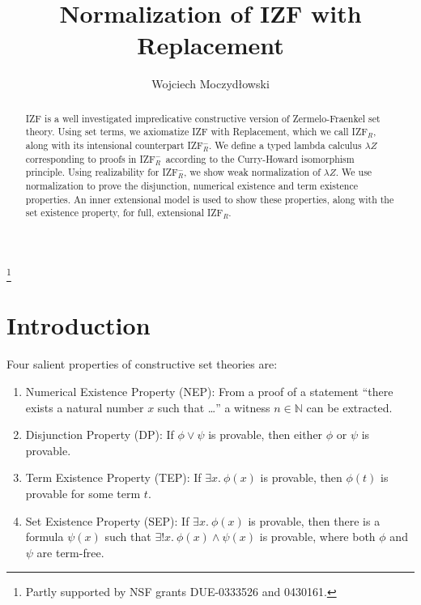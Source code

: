\documentclass{LMCS}
\newcommand{\nat}{\ensuremath{\mathbb{N}}}
\newcommand{\izfr}{IZF${}_R$}
\newcommand{\iizfr}{IZF${}_R^{-}$}
\newcommand{\li}{\lambda Z}
\begin{document}
\title{Normalization of IZF with Replacement}

\author{Wojciech Moczyd\l owski}
\address{Department of Computer Science, Cornell University, Ithaca, NY\ 14853, USA}
\thanks{Partly supported by NSF grants DUE-0333526 and 0430161.}

\titlecomment{}

\begin{abstract}
\noindent
IZF is a well investigated impredicative constructive version of
Zermelo-Fraen\-kel set theory. Using set terms, we axiomatize IZF with
Replacement, which we call \izfr, along with its intensional
counterpart \iizfr. We define a typed lambda calculus $\li$
corresponding to proofs in \iizfr\ according to the Curry-Howard
isomorphism principle. Using realizability for \iizfr, we show weak
normalization of $\li$. We use normalization to prove the disjunction,
numerical existence and term existence properties.  An inner
extensional model is used to show these properties, along with the set
existence property, for full, extensional \izfr.
\end{abstract}

\maketitle

\section{Introduction}

Four salient properties of constructive set theories are:
\begin{enumerate}[$\bullet$]
\item Numerical Existence Property (NEP): From a proof of a statement
``there exists a natural number $x$ such that {\ldots}'' a witness $n \in
\nat$ can be extracted. 
\item Disjunction Property (DP): If $\phi \lor \psi$ is provable, then
either $\phi$ or $\psi$ is provable.
\item Term Existence Property (TEP): If $\exists x.\ \phi(x)$ is
provable, then $\phi(t)$ is provable for some term $t$.
\item Set Existence Property (SEP): If $\exists x.\ \phi(x)$ is
provable, then there is a formula $\psi(x)$ such that $\exists! x.\ \phi(x)
\land \psi(x)$ is provable, where both $\phi$ and $\psi$ are term-free. 
\end{enumerate}
\end{document}
